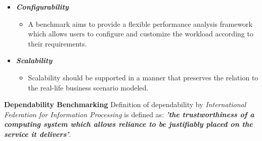 \begin{itemize}
\begin{itemize}
  	\item \textbf{\textit{Configurability}}
  	\begin{itemize}
  		\item A benchmark aims to provide a flexible performance analysis framework which allows users to configure and customize the workload according to their requirements.
	\end{itemize}

  	\item \textbf{\textit{Scalability}}
  	\begin{itemize}
  		\item Scalability should be supported in a manner that preserves the relation to the real-life business scenario modeled. 
	\end{itemize}
  \end{itemize}
\end{itemize}

\textbf{Dependability Benchmarking}
Definition of dependability by \textit{International Federation for Information Processing} is defined as: \textbf{\textit{'the trustworthiness of a computing system which allows reliance to be justifiably placed on the service it delivers'}}.


